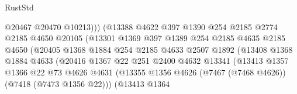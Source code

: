 \begin{lexlean}{RustStd}
\begin{coremodule}
                                        @20467
                                        @20470
                                        @10213)))
                                  (@13388
                                    @4622
                                    @397
                                    @1390
                                    @254
                                    @2185
                                    @2774
                                    @2185
                                    @4650
                                    @20105
                                    (@13301
                                      @1369
                                      @397
                                      @1389
                                      @254
                                      @2185
                                      @4635
                                      @2185
                                      @4650
                                      (@20405
                                        @1368
                                        @1884
                                        @254
                                        @2185
                                        @4633
                                        @2507
                                        @1892
                                        (@13408
                                          @1368
                                          @1884
                                          @4633
                                          (@20416
                                            @1367
                                            @22
                                            @251
                                            @2400
                                            @4632
                                            @13341
                                            (@13413
                                              @1357
                                              @1366
                                              @22
                                              @73
                                              @4626
                                              @4631
                                              (@13355
                                                @1356
                                                @4626
                                                (@7467 (@7468 @4626))
                                                (@7418 (@7473 @1356 @22)))
                                              (@13413
                                                @1364

\end{coremodule}
\end{lexlean}
